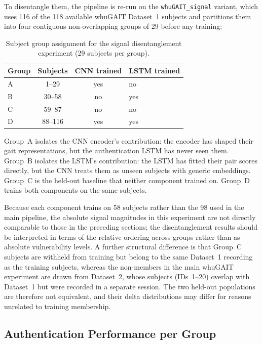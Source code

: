 To disentangle them, the pipeline is re-run on the \texttt{whuGAIT\_signal} variant, which uses 116 of the 118 available whuGAIT Dataset~1 subjects and partitions them into four contiguous non-overlapping groups of 29 before any training:

\begin{table}[htbp]
\centering
\caption{Subject group assignment for the signal disentanglement experiment (29 subjects per group).}
\label{tab:signal_design}
\begin{tabular}{lccl}
\toprule
Group & Subjects & CNN trained & LSTM trained \\
\midrule
A &   1--29  & yes & no  \\
B &  30--58  & no  & yes \\
C &  59--87  & no  & no  \\
D &  88--116 & yes & yes \\
\bottomrule
\end{tabular}
\end{table}

Group~A isolates the CNN encoder's contribution: the encoder has shaped their gait representations, but the authentication LSTM has never seen them. Group~B isolates the LSTM's contribution: the LSTM has fitted their pair scores directly, but the CNN treats them as unseen subjects with generic embeddings. Group~C is the held-out baseline that neither component trained on. Group~D trains both components on the same subjects.

Because each component trains on 58 subjects rather than the 98 used in the main pipeline, the absolute signal magnitudes in this experiment are not directly comparable to those in the preceding sections; the disentanglement results should be interpreted in terms of the relative ordering across groups rather than as absolute vulnerability levels. A further structural difference is that Group~C subjects are withheld from training but belong to the same Dataset~1 recording as the training subjects, whereas the non-members in the main whuGAIT experiment are drawn from Dataset~2, whose subjects (IDs~1--20) overlap with Dataset~1 but were recorded in a separate session. The two held-out populations are therefore not equivalent, and their delta distributions may differ for reasons unrelated to training membership.

\subsection{Authentication Performance per Group}
\label{ssec:mia_signal_auth}

